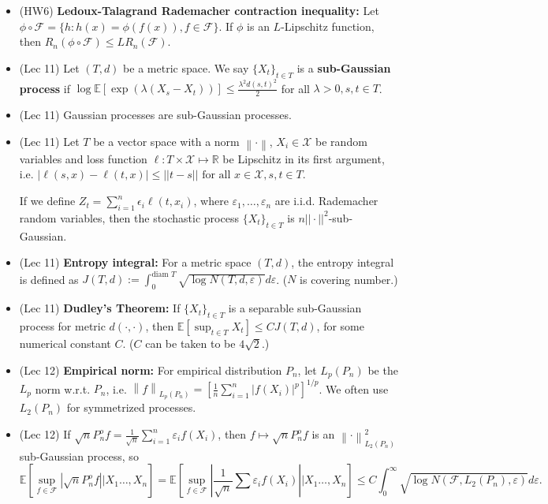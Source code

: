 \documentclass[twoside]{article}
\newcommand{\dis}{\displaystyle}
\newcommand{\norm}[1]{\left\|{#1}\right\|} %
\newcommand\bbE{\mathbb{E}}
\newcommand\bbR{\mathbb{R}}
\newcommand\calF{\mathcal{F}}
\def\eps{\varepsilon}
\newcommand\lmb{\lambda}
\begin{document}
\begin{itemize}
\item (HW6) \textbf{Ledoux-Talagrand Rademacher contraction inequality:} Let $\phi \circ \calF = \{ h: h(x) = \phi(f(x)), f \in \calF \}$. If $\phi$ is an $L$-Lipschitz function, then $R_n(\phi \circ \calF) \leq L R_n(\calF)$.

\item (Lec 11) Let $(T,d)$ be a metric space. We say $\{X_t\}_{t \in T}$ is a \textbf{sub-Gaussian process} if  $\log \bbE \left[ \exp \left( \lambda(X_s - X_t) \right) \right] \leq \dis\frac{\lambda^2 d(s,t)^2}{2}$ for all $\lmb > 0, s,t \in T$.

\item (Lec 11) Gaussian processes are sub-Gaussian processes.

\item (Lec 11) Let $T$ be a vector space with a norm $\norm{\cdot}$, $X_i \in \mathcal{X}$ be random variables and loss function $\ell: T \times \mathcal{X} \mapsto \bbR$ be Lipschitz in its first argument, i.e. $|\ell(s,x) - \ell(t,x)| \leq ||t - s|| \text{ for all } x \in \mathcal{X}, s,t \in T$.

If we define $Z_t = \sum_{i=1}^n \epsilon_i \ell(t,x_i)$, where $\eps_1, \dots, \eps_n$ are i.i.d. Rademacher random variables, then the stochastic process $\{X_t\}_{t \in T}$ is $n ||\cdot||^2$-sub-Gaussian.

\item (Lec 11) \textbf{Entropy integral:} For a metric space $(T, d)$, the entropy integral is defined as $J(T, d) := \dis\int_0^{\text{diam } T} \sqrt{\log N(T, d, \eps)} d\eps$. ($N$ is covering number.)

\item (Lec 11) \textbf{Dudley's Theorem:} If $\{X_t\}_{t \in T}$ is a separable sub-Gaussian process for metric $d(\cdot, \cdot)$, then $\bbE \left[ \dis\sup_{t \in T} X_t \right] \leq C J(T, d)$, for some numerical constant $C$. ($C$ can be taken to be $4\sqrt{2}$.)

\item (Lec 12) \textbf{Empirical norm:} For empirical distribution $P_n$, let $L_p(P_n)$ be the $L_p$ norm w.r.t. $P_n$, i.e. $\norm{f}_{L_p(P_n)} = \left[\dis\frac{1}{n}\sum_{i=1}^n |f(X_i)|^p \right]^{1/p}$. We often use $L_2(P_n)$ for symmetrized processes.

\item (Lec 12) If $\sqrt{n}P_n^o f = \dis\frac{1}{\sqrt{n}}\sum_{i=1}^n \eps_i f(X_i)$, then $f \mapsto \sqrt{n}P_n^o f$ is an $\norm{\cdot}_{L_2(P_n)}^2$ sub-Gaussian process, so
\[ \bbE \left[\sup_{f \in \calF} \left| \sqrt{n}P_n^o f \right| \Bigg| X_1 \dots, X_n \right] =  \bbE \left[\sup_{f \in \calF} \left| \frac{1}{\sqrt{n}}\sum \eps_i f(X_i) \right| \Bigg| X_1 \dots, X_n \right] \leq C \int_{0}^\infty \sqrt{\log N(\calF,  L_2(P_n) , \eps)} d\eps. \]


\end{itemize}
\end{document}
